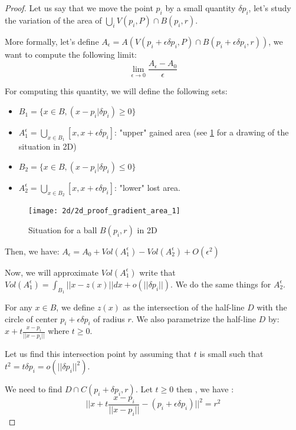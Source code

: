 \begin{proof}

Let us say that we move the point $ p _i $ by a small quantity $ \delta p_i $,
let's study the variation of the area of $ \bigcup_i V(p_i, P) \cap B(p_i, r) $.

More formally, let's define $ A_{\epsilon} = A(V(p_i + \epsilon \delta p_i, P) \cap
B(p_i + \epsilon \delta p_i, r)) $, we want to compute the following limit:
$$ \lim\limits_{\epsilon \to 0} \frac{A_{\epsilon} - A_0}{\epsilon} $$

For computing this quantity, we will define the following sets:
\begin{itemize}
    \item $ B_1 = \{ x \in B, (x - p_i | \delta p_i) \geq 0\} $
    \item $ A_1^{\epsilon} = \bigcup_{x \in B_1} [x, x + \epsilon \delta p_i] $:
        "upper" gained area (see \ref{fig:demo-gradient} for a drawing of the
        situation in 2D)
    \item $ B_2 = \{ x \in B, (x - p_i | \delta p_i) \leq 0\} $
    \item $ A_2^{\epsilon} = \bigcup_{x \in B_2} [x, x + \epsilon \delta p_i] $:
        "lower" lost area.
\end{itemize}

\begin{figure}[h]
    \centering
    \texttt{[image: 2d/2d\_proof\_gradient\_area\_1]}
    \caption{Situation for a ball $ B(p_i, r) $ in 2D}
    \label{fig:demo-gradient}
\end{figure}

Then, we have: $ A_\epsilon = A_0 + Vol(A_1^\epsilon) - Vol(A_2^\epsilon) +
O(\epsilon^2) $

Now, we will approximate $ Vol(A_1^\epsilon) $ write that $ Vol(A_1^\epsilon) =
\int_{B_1} || x - z(x) || dx + o(||\delta p_i||) $. We do the same things for $
A_2^\epsilon $.

For any $ x \in B $, we define $ z(x) $ as the intersection of the half-line $ D
$ with the circle of center $ p_i + \epsilon \delta p_i $ of radius $ r $. We
also parametrize the half-line $ D $ by: $ x + t \frac{x - p_i}{||x - p_i||} $
where $ t \ge 0 $.

Let us find this intersection point by assuming that $ t $ is small
such that $ t^2 = t \delta p_i = o(||\delta p_i||^2) $.

We need to find $ D \cap C(p_i + \delta p_i, r) $. Let $ t \ge 0 $ then , we have :
\begin{equation}
    || x + t \frac{x - p_i}{||x - p_i||} - (p_i + \epsilon \delta p_i) ||^2 = r^2
    \tag{$\star$}
\end{equation}


\end{proof}
